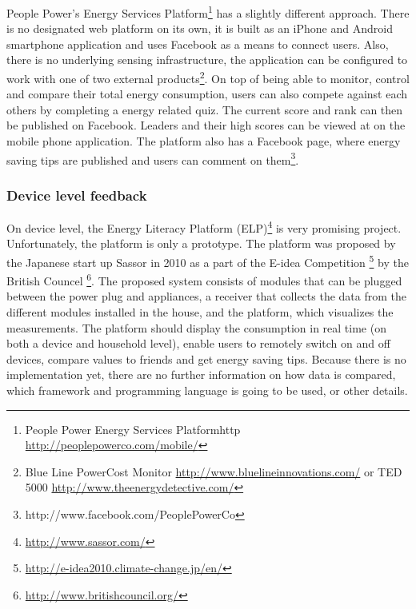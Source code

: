People Power's Energy Services Platform\footnote{People Power Energy Services Platformhttp \url{http://peoplepowerco.com/mobile/}} has a slightly different approach. There is no designated web platform on its own, it is built as an iPhone and Android smartphone application and uses Facebook as a means to connect users. Also, there is no underlying sensing infrastructure, the application can be configured to work with one of two external products\footnote{Blue Line PowerCost Monitor \url{http://www.bluelineinnovations.com/} or TED 5000 \url{http://www.theenergydetective.com/}}. On top of being able to monitor, control and compare their total energy consumption, users can also compete against each others by completing a energy related quiz. The current score and rank can then be published on Facebook. Leaders and their high scores can be viewed at on the mobile phone application. The platform also has a Facebook page, where energy saving tips are published and users can comment on them\footnote{http://www.facebook.com/PeoplePowerCo}. 


\subsubsection{Device level feedback}  
On device level, the Energy Literacy Platform  (ELP)\footnote{\url{http://www.sassor.com/}} is very promising project. Unfortunately, the platform is only a prototype. The platform was proposed by the Japanese start up Sassor in 2010 as a part of the E-idea Competition \footnote{\url{http://e-idea2010.climate-change.jp/en/}} by the British Councel \footnote{\url{http://www.britishcouncil.org/}}.
The proposed system consists of modules that can be plugged between the power plug and appliances, a receiver that collects the data from the different modules installed in the house, and the platform, which visualizes the measurements. The platform should display the consumption in real time (on both a device and household level), enable users to remotely switch on and off devices, compare values to friends and get energy saving tips.
Because there is no implementation yet, there are no further information on how data is compared, which framework and programming language is going to be used, or other details. 

